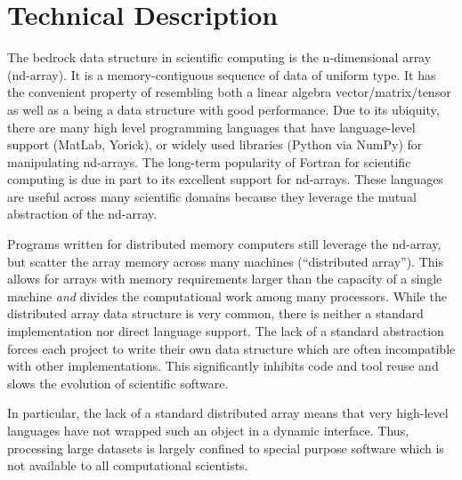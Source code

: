 \documentclass[letterpaper,12pt]{article}
\begin{document}

\section*{Technical Description}

The bedrock data structure in scientific computing is the n-dimensional array (nd-array).  
It is a memory-contiguous sequence of data of uniform type.  It has the convenient property 
of resembling both a linear algebra vector/matrix/tensor as well as a being a data structure
with good performance.  Due to its ubiquity, there are many high level programming 
languages that have language-level support (MatLab\cite{matlab}, Yorick\cite{Munro1995}), 
or widely used libraries (Python\cite{CPython} via NumPy\cite{Oliphant2006}) for 
manipulating nd-arrays.  The long-term popularity of Fortran for scientific computing is 
due in part to its excellent support for nd-arrays.  These languages are useful across 
many scientific domains because they leverage the mutual abstraction of the nd-array.

Programs written for distributed memory computers still leverage the nd-array, but scatter 
the array memory across many machines (``distributed array'').  This allows for arrays 
with memory requirements larger than the capacity of a single machine \emph{and} divides 
the computational work among many processors.  While the distributed array data structure 
is very common, there is neither a standard implementation nor direct language support.  
The lack of a standard abstraction forces each project to write their own data structure 
which are often incompatible with other implementations.  This significantly inhibits code
and tool reuse and slows the evolution of scientific software.

In particular, the lack of a standard distributed array means that very high-level 
languages have not wrapped such an object in a dynamic interface.  Thus, processing large 
datasets is largely confined to special purpose software which is not available to all 
computational scientists.
\end{document}
